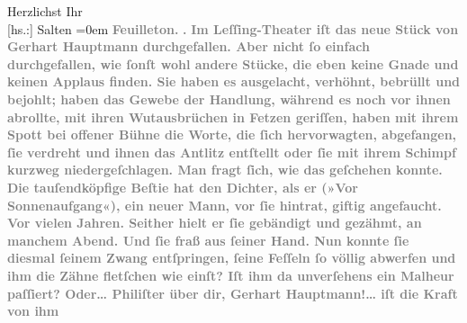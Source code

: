 \begin{ledgroupsized}[t]{13cm}
           \pstart
           Herzlichst Ihr {\\[\baselineskip]}{[}hs.:{]} \spacefill\mbox{Salten}\pend
           \leftskip=0em{}{\bigskip}\pstart
           \noindent{}\centering{}{\pb}\textcolor{gray}{\textbf{\textbf{Feuilleton.}}}\pend
           \pstart
           \noindent{}\centering{}\textcolor{gray}{\textbf{\textbf{.}}}\pend
           \pstart
           \noindent{}\textcolor{gray}{\textbf{Im Leſſing-Theater iſt das
                  neue Stück von Gerhart Hauptmann durchgefallen. Aber nicht
                  ſo einfach durchgefallen, wie ſonſt wohl andere Stücke, die eben keine Gnade und
                  keinen Applaus finden. Sie haben es ausgelacht, verhöhnt, bebrüllt und bejohlt;
                  haben das Gewebe der Handlung, während es noch vor ihnen abrollte, mit ihren
                  Wutausbrüchen in Fetzen geriſſen, haben mit ihrem Spott bei offener Bühne die
                  Worte, die ſich hervorwagten, abgefangen, ſie verdreht und ihnen das Antlitz
                  entſtellt oder ſie mit ihrem Schimpf kurzweg niedergeſchlagen. Man fragt ſich, wie
                  das geſchehen konnte. Die tauſendköpfige Beſtie hat den Dichter, als er (»Vor Sonnenaufgang«), ein neuer Mann, vor ſie
                  hintrat, giftig angefaucht. Vor vielen Jahren. Seither hielt er ſie gebändigt und
                  gezähmt, an manchem Abend. Und ſie fraß aus ſeiner Hand. Nun konnte ſie diesmal
                  ſeinem Zwang entſpringen, ſeine Feſſeln ſo völlig abwerfen und ihm die Zähne
                  fletſchen wie einſt? Iſt ihm da unverſehens ein Malheur paſſiert? Oder{\dots} Philiſter über dir, Gerhart Hauptmann!{\dots} iſt die Kraft von ihm
}}
\end{ledgroupsized}
